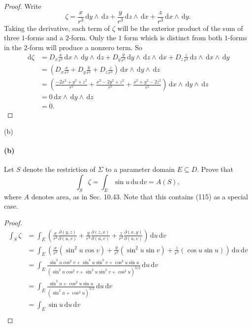 \documentclass[12pt]{article}
\newenvironment{fullbox}{\begin{lrbox}{\savefullbox}\begin{minipage}{\dimexpr\textwidth-2\fboxsep\relax}}{\end{minipage}\end{lrbox}\begin{center}\framebox[\textwidth]{\usebox{\savefullbox}}\end{center}}
\newenvironment{pbox}[1][]{\begin{fullbox}\ifx#1\empty\else\paragraph{#1}\fi}{\end{fullbox}}
\newcommand{\<}{\langle}
\renewcommand{\>}{\rangle}
\newcommand{\dd}[1]{\,\mathrm{d}#1}
\newcommand{\jac}[2]{\frac{\partial(#1)}{\partial(#2)}}
\begin{document}
\begin{proof}
    Write
    \[
        \zeta = \frac{x}{r^3} \dd{y} \wedge \dd{z} + \frac{y}{r^3} \dd{z} \wedge \dd{x} + \frac{z}{r^3} \dd{x} \wedge \dd{y}.
    \]
    Taking the derivative, each term of $\zeta$ will be the exterior product of the sum of three $1$-forms and a $2$-form. Only the $1$ form which is distinct from both $1$-forms in the $2$-form will produce a nonzero term. So
    \begin{align*}
        \dd{\zeta}
            &= D_x \frac{x}{r^3} \dd{x} \wedge \dd{y} \wedge \dd{z} 
                + D_y \frac{y}{r^3} \dd{y} \wedge \dd{z} \wedge \dd{x} 
                + D_z \frac{z}{r^3} \dd{z} \wedge \dd{x} \wedge \dd{y} \\
            &= \left(D_x \frac{x}{r^3} + D_y \frac{y}{r^3} + D_z \frac{z}{r^3}\right) \dd{x} \wedge \dd{y} \wedge \dd{z} \\
            &= \left(\frac{-2x^2 + y^2 + z^2}{r^5} + \frac{x^2 - 2y^2 + z^2}{r^5} + \frac{x^2 + y^2 - 2z^2}{r^5}\right) \dd{x} \wedge \dd{y} \wedge \dd{z} \\
            &= 0 \dd{x} \wedge \dd{y} \wedge \dd{z} \\
            &= 0.
    \end{align*}

\end{proof}


\newpage
\begin{pbox}[(b)]
    Let $S$ denote the restriction of $\Sigma$ to a parameter domain $E\subseteq D$. Prove that
    \[\int_S \zeta = \int_E \sin{u} \dd{u}\dd{v} = A(S),\]
    where $A$ denotes area, as in Sec. 10.43. Note that this contains (115) as a special case.
\end{pbox}

\begin{proof}
    \begin{align*}
        \int_S \zeta
            &= \int_E \left(\frac{x}{r^3} \jac{y, z}{u, v} + \frac{y}{r^3} \jac{z, x}{u, v} + \frac{z}{r^3} \jac{x, y}{u, v} \right) \dd{u} \dd{v} \\
            &= \int_E \left(\frac{x}{r^3} (\sin^2 u \cos v) + \frac{y}{r^3} (\sin^2 u \sin v) + \frac{z}{r^3} (\cos u \sin u) \right) \dd{u} \dd{v} \\
            &= \int_E \frac{\sin^3 u \cos^2 v + \sin^3 u \sin^2 v + \cos^2 u \sin u}{(\sin^2u\cos^2v + \sin^2u\sin^2v + \cos^2u)^{3/2}} \dd{u} \dd{v} \\
            &= \int_E \frac{\sin^3 u + \cos^2 u \sin u}{(\sin^2u + \cos^2u)^{3/2}} \dd{u} \dd{v} \\
            &= \int_E \sin u \dd{u} \dd{v} \\
    \end{align*}
\end{proof}
\end{document}

